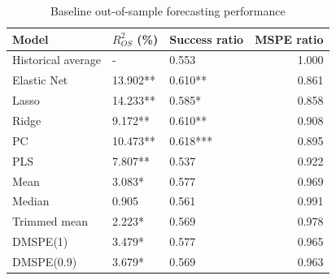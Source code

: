 \begin{table}

\caption{Baseline out-of-sample forecasting performance}
\centering
\begin{tabular}[t]{lllr}
\toprule
Model & $R^2_{OS}$ (\%) & Success ratio & MSPE ratio\\
\midrule
Historical average & - & 0.553 & 1.000\\
Elastic Net & 13.902** & 0.610** & 0.861\\
Lasso & 14.233** & 0.585* & 0.858\\
Ridge & 9.172** & 0.610** & 0.908\\
PC & 10.473** & 0.618*** & 0.895\\
\addlinespace
PLS & 7.807** & 0.537 & 0.922\\
Mean & 3.083* & 0.577 & 0.969\\
Median & 0.905 & 0.561 & 0.991\\
Trimmed mean & 2.223* & 0.569 & 0.978\\
DMSPE(1) & 3.479* & 0.577 & 0.965\\
\addlinespace
DMSPE(0.9) & 3.679* & 0.569 & 0.963\\
\bottomrule
\end{tabular}
\end{table}
